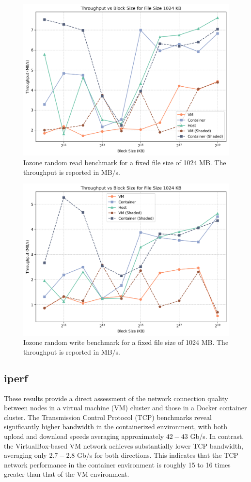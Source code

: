 \begin{figure}
    \centering
    \includegraphics[width=0.8\linewidth]{assets/random read_filesize_1024.png}
    \caption{Iozone random read benchmark for a fixed file size of 1024 MB. The throughput is reported in MB/s.}
    \label{fig:random_read_filesize_1024}
\end{figure}

\begin{figure}
    \centering
    \includegraphics[width=0.8\linewidth]{assets/random write_filesize_1024.png}
    \caption{Iozone random write benchmark for a fixed file size of 1024 MB. The throughput is reported in MB/s.}
    \label{fig:random_write_filesize_1024}
\end{figure}

\subsection{iperf}

These results provide a direct assessment of the network connection quality between nodes in a virtual machine (VM) cluster and those in a Docker container cluster. The Transmission Control Protocol (TCP) benchmarks reveal significantly higher bandwidth in the containerized environment, with both upload and download speeds averaging approximately $42-43$ Gb/s. In contrast, the VirtualBox-based VM network achieves substantially lower TCP bandwidth, averaging only $2.7-2.8$ Gb/s for both directions. This indicates that the TCP network performance in the container environment is roughly 15 to 16 times greater than that of the VM environment.

